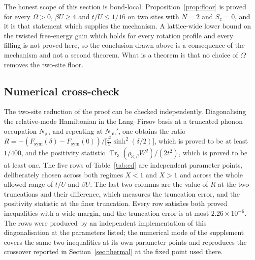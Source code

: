\documentclass[11pt]{article}
\theoremstyle{plain}
\theoremstyle{definition}
\DeclareMathOperator{\Tr}{Tr}
\begin{document}
The honest scope of this section is bond-local. Proposition~\ref{prop:floor} is
proved for every $\Omega>0$, $\beta U\ge4$ and $t/U\le1/16$ on two sites with
$N=2$ and $S_z=0$, and it is that statement which supplies the mechanism. A
lattice-wide lower bound on the twisted free-energy gain which holds for every
rotation profile and every filling is not proved here, so the conclusion drawn
above is a consequence of the mechanism and not a second theorem. What is a
theorem is that no choice of $\Omega$ removes the two-site floor.

\subsection{Numerical cross-check}\label{sec:ed}

The two-site reduction of the proof can be checked independently. Diagonalising
the relative-mode Hamiltonian in the Lang--Firsov basis at a truncated phonon
occupation $N_{\mathrm{ph}}$ and repeating at $N_{\mathrm{ph}}'$,
one obtains the ratio
$R=-(F_{\mathrm{sym}}(\delta)-F_{\mathrm{sym}}(0))\big/\bigl[\frac{t^{2}}{U}\sinh^{2}(\delta/2)\bigr]$,
which is proved to be at least $1/400$, and the positivity statistic
$\Tr_3(\rho_{3,\beta}W^{2})/(2t^{2})$, which is proved to be at least one. The
five rows of Table~\ref{tab:ed} are independent parameter points, deliberately
chosen across both regimes $X<1$ and $X>1$ and across the whole allowed range of
$t/U$ and $\beta U$. The last two columns are the value of $R$ at the two
truncations and their difference, which measures the truncation error, and the
positivity statistic at the finer truncation. Every row satisfies both proved
inequalities with a wide margin, and the truncation error is at most
$2.26\times10^{-6}$. The rows were produced by an independent implementation of
this diagonalisation at the parameters listed; the numerical mode of the
supplement covers the same two inequalities at its own parameter points and
reproduces the crossover reported in Section~\ref{sec:thermal} at the fixed point
used there.
\end{document}
